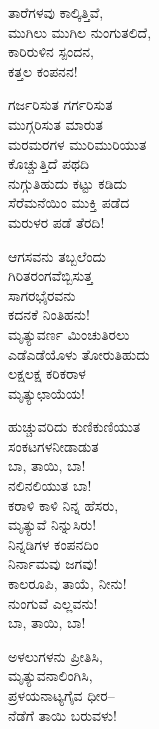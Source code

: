 \begin{myquote}
ತಾರೆಗಳವು ಕಾಲ್ಕಿತ್ತಿವೆ,\\ಮುಗಿಲು ಮುಗಿಲ ನುಂಗುತಲಿದೆ,\\ಕಾರಿರುಳಿನ ಸ್ಪಂದನ,\\ಕತ್ತಲ ಕಂಪನನ!
\end{myquote}

\begin{myquote}
ಗರ್ಜರಿಸುತ ಗರ್ಗರಿಸುತ\\ಮುಗ್ಗರಿಸುತ ಮಾರುತ\\ಮರಮರಗಳ ಮುರಿಮುರಿಯುತ\\ಕೊಚ್ಚುತ್ತಿದೆ ಪಥದಿ\\ನುಗ್ಗುತಿಹುದು ಕಟ್ಟು ಕಡಿದು\\ಸೆರೆಮನೆಯಿಂ ಮುಕ್ತಿ ಪಡೆದ\\ಮರುಳರ ಪಡೆ ತೆರದಿ!
\end{myquote}

\begin{myquote}
ಆಗಸವನು ತಬ್ಬಲೆಂದು\\ಗಿರಿತರಂಗವೆಬ್ಬಿಸುತ್ತ\\ಸಾಗರಭೈರವನು\\ಕದನಕೆ ನಿಂತಿಹನು!\\ಮೃತ್ಯುವರ್ಣ ಮಿಂಚುತಿರಲು\\ಎಡೆಎಡೆಯೊಳು ತೋರುತಿಹುದು\\ಲಕ್ಷಲಕ್ಷ ಕರಿಕರಾಳ\\ಮೃತ್ಯುಛಾಯೆಯ!
\end{myquote}

\begin{myquote}
ಹುಚ್ಚುವರಿದು ಕುಣಿಕುಣಿಯುತ\\ಸಂಕಟಗಳನೀಡಾಡುತ\\ಬಾ, ತಾಯಿ, ಬಾ!\\ನಲಿನಲಿಯುತ ಬಾ!\\ಕರಾಳಿ ಕಾಳಿ ನಿನ್ನ ಹೆಸರು,\\ಮೃತ್ಯುವೆ ನಿನ್ನುಸಿರು!\\ನಿನ್ನಡಿಗಳ ಕಂಪನದಿಂ\\ನಿರ್ನಾಮವು ಜಗವು!\\ಕಾಲರೂಪಿ, ತಾಯೆ, ನೀನು!\\ನುಂಗುವೆ ಎಲ್ಲವನು!\\ಬಾ, ತಾಯಿ, ಬಾ!
\end{myquote}

\delimiter

\begin{myquote}
ಅಳಲುಗಳನು ಪ್ರೀತಿಸಿ,\\ಮೃತ್ಯುವನಾಲಿಂಗಿಸಿ,\\ಪ್ರಳಯನಾಟ್ಯಗೈವ ಧೀರ–\\ನೆಡೆಗೆ ತಾಯಿ ಬರುವಳು!
\end{myquote}

